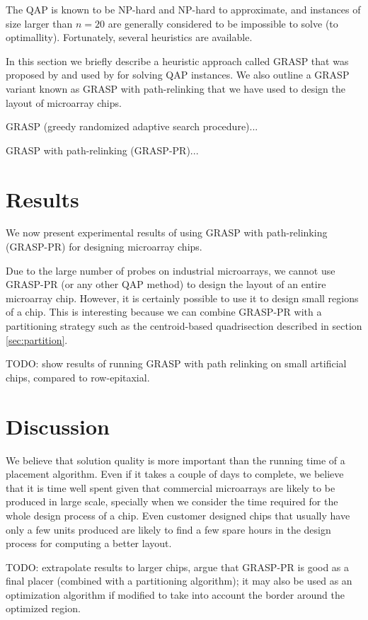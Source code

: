 \documentclass{bioinfo}
\begin{document}
The QAP is known to be NP-hard and NP-hard to approximate, and instances of size larger than $n = 20$ are generally considered to be impossible to solve (to optimallity). Fortunately, several heuristics are available.

In this section we briefly describe a heuristic approach called GRASP that was proposed by \citealp{FEO95} and used by \citealp{LI94} for solving QAP instances. We also outline a GRASP variant known as GRASP with path-relinking \citep{OLIVEIRA04} that we have used to design the layout of microarray chips.

GRASP (greedy randomized adaptive search procedure)...

GRASP with path-relinking (GRASP-PR)...

\section{Results}

We now present experimental results of using GRASP with path-relinking (GRASP-PR) for designing microarray chips.

Due to the large number of probes on industrial microarrays, we cannot use GRASP-PR (or any other QAP method) to design the layout of an entire microarray chip. However, it is certainly possible to use it to design small regions of a chip. This is interesting because we can combine GRASP-PR with a partitioning strategy such as the centroid-based quadrisection described in section \ref{sec:partition}.

TODO: show results of running GRASP with path relinking on small artificial chips, compared to row-epitaxial.

\section{Discussion}

We believe that solution quality is more important than the running time of a placement algorithm. Even if it takes a couple of days to complete, we believe that it is time well spent given that commercial microarrays are likely to be produced in large scale, specially when we consider the time required for the whole design process of a chip. Even customer designed chips that usually have only a few units produced are likely to find a few spare hours in the design process for computing a better layout.

TODO: extrapolate results to larger chips, argue that GRASP-PR is good as a final placer (combined with a partitioning algorithm); it may also be used as an optimization algorithm if modified to take into account the border around the optimized region.
\end{document}
